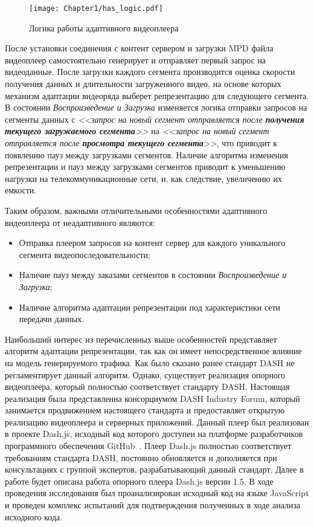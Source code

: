 \begin{figure}[htbp]
\begin{center}
\texttt{[image: Chapter1/has\_logic.pdf]}
\caption{Логика работы адаптивного видеоплеера}
\label{fig:has_logic}
\end{center}
\end{figure}

После установки соединения с контент сервером и загрузки MPD файла видеоплеер самостоятельно генерирует и отправляет первый запрос на видеоданные. После загрузки каждого сегмента производится оценка скорости получения данных и длительности загруженного видео, на основе которых механизм адаптации видеоряда выберет репрезентацию для следующего сегмента. В состоянии \textit{Воспроизведение и Загрузка} изменяется логика отправки запросов на сегменты данных с \textit{<<запрос на новый сегмент отправляется после \textbf{получения текущего загружаемого сегмента}>>} на \textit{<<запрос на новый сегмент отправляется после \textbf{просмотра текущего сегмента}>>}, что приводит к появлению пауз между загрузками сегментов. Наличие алгоритма изменения репрезентации и пауз между загрузками сегментов приводит к уменьшению нагрузки на телекоммуникационные сети, и, как следствие, увеличению их емкости.

Таким образом, важными отличительными особенностями адаптивного видеоплеера от неадаптивного являются:
\begin{itemize}
  \item Отправка плеером запросов на контент сервер для каждого уникального сегмента видеопоследовательности;
  \item Наличие пауз между заказами сегментов в состоянии \textit{Воспроизведение и Загрузка};
  \item Наличие алгоритма адаптации репрезентации под характеристики сети передачи данных.
\end{itemize}

Наибольший интерес из перечисленных выше особенностей представляет алгоритм адаптации репрезентации, так как он имеет непосредственное влияние на модель генерируемого трафика. Как было сказано ранее стандарт DASH не регламентирует данный алгоритм. Однако, существует реализация опорного видеоплеера, который полностью соответствует стандарту DASH. Настоящая реализация была представленна консорциумом DASH Industry Forum, который занимается продвижением настоящего стандарта и предоставляет открытую реализацию видеоплеера и серверных приложений. Данный плеер был реализован в проекте Dash.js, исходный код которого доступен на платформе разработчиков программного обеспечения GitHub~\cite{DashJS}. Плеер Dash.js полностью соответствует требованиям стандарта DASH, постоянно обновляется и дополняется при консультациях с группой экспертов, разрабатывающий данный стандарт. Далее в работе будет описана работа опорного плеера Dash.js версии 1.5. В ходе проведения исследования был проанализирован исходный код на языке JavaScript и проведен комплекс испытаний для подтверждения полученных в ходе анализа исходного кода.

